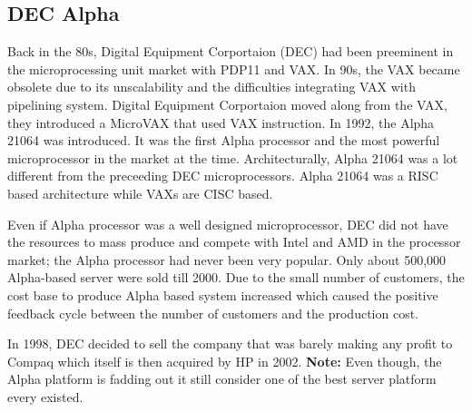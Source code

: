 \documentclass[letterpaper,10pt,titlepage]{article}
\begin{document}
\subsection{DEC Alpha}
\indent Back in the 80s, Digital Equipment Corportaion (DEC) had been preeminent
in the microprocessing unit market with PDP11 and VAX.  In 90s, the VAX
became obsolete due to its unscalability and the difficulties 
integrating VAX with pipelining system. Digital Equipment Corportaion 
moved along from the VAX, they introduced a MicroVAX that used VAX 
instruction. In 1992, the Alpha 21064 was introduced. It was the first 
Alpha processor and the most powerful microprocessor in the market at the
time. Architecturally, Alpha 21064 was a lot different from the preceeding 
DEC microprocessors. Alpha 21064 was a RISC based architecture while VAXs
are CISC based. 
\par
Even if Alpha processor was a well designed microprocessor, DEC did not 
have the resources to mass produce and compete with Intel and AMD in the 
processor market; the Alpha processor had never been very popular. Only
about 500,000 Alpha-based server were sold till 2000. Due to the small 
number of customers, the cost base to produce Alpha based system increased
which caused the positive feedback cycle between the number of customers 
and the production cost.
\par
In 1998, DEC decided to sell the company that was barely making any profit 
to Compaq which itself is then acquired by HP in 2002. 
\textbf{Note:} Even though, the Alpha platform is fadding out it still 
consider one of the best server platform every existed. 
\end{document}
